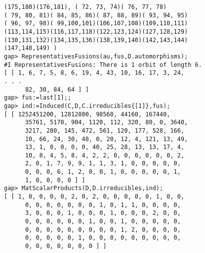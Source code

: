 \documentclass{article}
\begin{document}
\begin{verbatim}
(175,180)(176,181), ( 72, 73, 74)( 76, 77, 78)
( 79, 80, 81)( 84, 85, 86)( 87, 88, 89)( 93, 94, 95)
( 96, 97, 98)( 99,100,101)(106,107,108)(109,110,111)
(113,114,115)(116,117,118)(122,123,124)(127,128,129)
(130,131,132)(134,135,136)(138,139,140)(142,143,144)
(147,148,149) )
gap> RepresentativesFusions(au,fus,D.automorphisms);
#I RepresentativesFusions: There is 1 orbit of length 6.
[ [ 1, 6, 7, 5, 8, 6, 19, 4, 43, 10, 16, 17, 3, 24, 
. . .
      82, 30, 84, 64 ] ]
gap> fus:=last[1];;
gap> ind:=Induced(C,D,C.irreducibles{[1]},fus);
[ [ 1252451200, 12812800, 98560, 44160, 167440, 
      35761, 5170, 904, 1120, 112, 320, 80, 0, 3640, 
      3217, 280, 145, 472, 561, 120, 177, 528, 166, 
      10, 66, 24, 30, 48, 0, 20, 12, 4, 121, 13, 49, 
      13, 1, 0, 0, 0, 0, 40, 25, 28, 13, 13, 17, 4, 
      10, 8, 4, 5, 8, 4, 2, 2, 0, 0, 0, 0, 0, 0, 2, 
      2, 0, 1, 7, 9, 9, 1, 1, 3, 1, 0, 0, 0, 0, 0, 
      0, 0, 0, 6, 1, 2, 0, 0, 1, 0, 0, 0, 0, 0, 1, 
      1, 0, 0, 0, 0 ] ]
gap> MatScalarProducts(D,D.irreducibles,ind);
[ [ 1, 0, 0, 0, 0, 2, 0, 2, 0, 0, 0, 0, 0, 1, 0, 0, 
      0, 0, 0, 0, 0, 0, 0, 1, 0, 1, 1, 0, 0, 0, 0, 
      3, 0, 0, 0, 1, 0, 0, 0, 1, 0, 0, 0, 2, 0, 0, 
      0, 0, 0, 0, 0, 0, 1, 0, 0, 1, 0, 0, 0, 0, 0, 
      0, 0, 0, 0, 0, 0, 0, 0, 0, 1, 2, 0, 0, 0, 0, 
      0, 0, 0, 0, 0, 1, 0, 0, 0, 0, 0, 0, 0, 0, 0, 
      0, 0, 0, 0, 0, 0, 0 ] ]
\end{verbatim}
\end{document}
